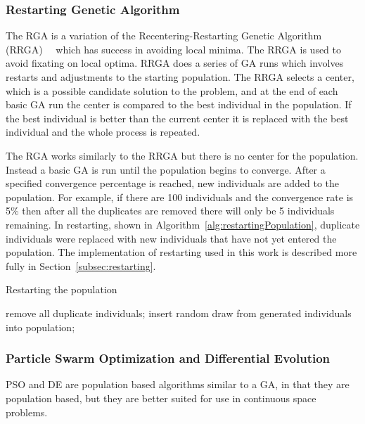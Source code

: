 \documentclass[conference]{IEEEtran}
\begin{document}
\subsubsection{Restarting Genetic Algorithm}

The RGA is a variation of the Recentering-Restarting Genetic Algorithm (RRGA)~\cite{hughes2013recentering}~\cite{hughes2013edit} which has success in avoiding local minima. The RRGA is used to avoid fixating on local optima. RRGA does a series of GA runs which involves restarts and adjustments to the starting population. The RRGA selects a center, which is a possible candidate solution to the problem, and at the end of each basic GA run the center is compared to the best individual in the population. If the best individual is better than the current center it is replaced with the best individual and the whole process is repeated.

The RGA works similarly to the RRGA but there is no center for the population. Instead a basic GA is run until the population begins to converge. After a specified convergence percentage is reached, new individuals are added to the population. For example, if there are 100 individuals and the convergence rate is 5\% then after all the duplicates are removed there will only be 5 individuals remaining. In restarting, shown in Algorithm~\ref{alg:restartingPopulation}, duplicate individuals were replaced with new individuals that have not yet entered the population. The implementation of restarting used in this work is described more fully in Section~\ref{subsec:restarting}.

\begin{algorithm}
\caption{Restarting the population}
\label{alg:restartingPopulation}
\begin{algorithmic}

  \STATE remove all duplicate individuals;
    \STATE insert random draw from generated individuals into population;
  \ENDWHILE
\ENDIF

\end{algorithmic}
\end{algorithm}

\subsubsection{Particle Swarm Optimization and Differential Evolution}

PSO and DE are population based algorithms similar to a GA, in that they are population based, but they are better suited for use in continuous space problems.
\end{document}
